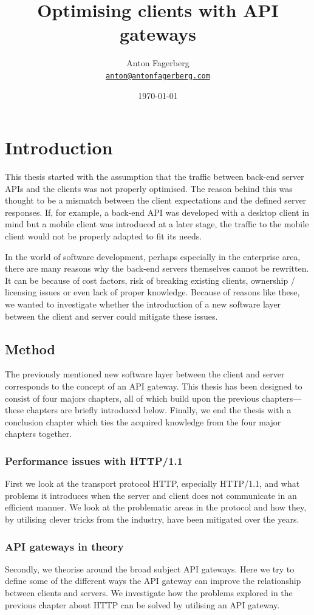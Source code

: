 \documentclass{cslthse-msc}
\author{
	Anton Fagerberg \\
	{\normalsize \href{mailto:anton@antonfagerberg.com}{\texttt{anton@antonfagerberg.com}}}
}
\title{Optimising clients with API gateways}
\subtitle{}
\date{\today}
\begin{document}
\makefrontmatter

\chapter{Introduction}
This thesis started with the assumption that the traffic between back-end server APIs and the clients was not properly optimised. The reason behind this was thought to be a mismatch between the client expectations and the defined server responses. If, for example, a back-end API was developed with a desktop client in mind but a mobile client was introduced at a later stage, the traffic to the mobile client would not be properly adapted to fit its needs.

In the world of software development, perhaps especially in the enterprise area, there are many reasons why the back-end servers themselves cannot be rewritten. It can be because of cost factors, risk of breaking existing clients, ownership / licensing issues or even lack of proper knowledge. Because of reasons like these, we wanted to investigate whether the introduction of a new software layer between the client and server could mitigate these issues.

\section{Method}

The previously mentioned new software layer between the client and server corresponds to the concept of an API gateway. This thesis has been designed to consist of four majors chapters, all of which build upon the previous chapters---these chapters are briefly introduced below. Finally, we end the thesis with a conclusion chapter which ties the acquired knowledge from the four major chapters together.

\subsection{Performance issues with HTTP/1.1}
First we look at the transport protocol HTTP, especially HTTP/1.1, and what problems it introduces when the server and client does not communicate in an efficient manner. We look at the problematic areas in the protocol and how they, by utilising clever tricks from the industry, have been mitigated over the years.

\subsection{API gateways in theory}
Secondly, we theorise around the broad subject API gateways. Here we try to define some of the different ways the API gateway can improve the relationship between clients and servers. We investigate how the problems explored in the previous chapter about HTTP can be solved by utilising an API gateway.
\end{document}
